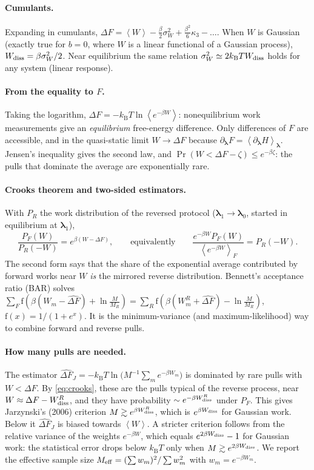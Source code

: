 \documentclass[11pt,a4paper]{article}
\newcommand{\kT}{k_{\mathrm B}T}
\newcommand{\avg}[1]{\left\langle #1\right\rangle}
\newcommand{\lam}{\bm{\lambda}}
\newcommand{\Wd}{W_{\rm diss}}
\newcommand{\dFJ}{\widehat{\Delta F}_J}
\begin{document}
\paragraph{Cumulants.} Expanding in cumulants,
$\Delta F=\avg W-\tfrac{\beta}{2}\sigma_W^2+\tfrac{\beta^2}{6}\kappa_3-\dots$. When $W$ is
Gaussian (exactly true for $b=0$, where $W$ is a linear functional of a Gaussian process),
$\Wd=\beta\sigma_W^2/2$. Near equilibrium the same relation $\sigma_W^2\simeq2\kT\Wd$ holds
for any system (linear response).

\paragraph{From the equality to $F$.} Taking the logarithm, $\Delta F=-\kT\ln\avg{e^{-\beta W}}$:
nonequilibrium work measurements give an \emph{equilibrium} free-energy difference. Only differences
of $F$ are accessible, and in the quasi-static limit $W\to\Delta F$ because
$\partial_{\lam}F=\avg{\partial_{\lam}H}_{\lam}$. Jensen's inequality gives the second law, and
$\Pr(W<\Delta F-\zeta)\le e^{-\beta\zeta}$: the pulls that dominate the average are exponentially rare.

\paragraph{Crooks theorem and two-sided estimators.} With $P_R$ the work distribution of the reversed
protocol ($\lam_1\to\lam_0$, started in equilibrium at $\lam_1$),
\begin{equation}
\frac{P_F(W)}{P_R(-W)}=e^{\beta(W-\Delta F)},\qquad\text{equivalently}\qquad
\frac{e^{-\beta W}P_F(W)}{\avg{e^{-\beta W}}_F}=P_R(-W).
\label{eq:crooks}
\end{equation}
The second form says that the share of the exponential average contributed by forward works near
$W$ \emph{is} the mirrored reverse distribution. Bennett's acceptance ratio (BAR) solves
$\sum_F\mathrm f(\beta(W_m-\widehat{\Delta F})+\ln\tfrac{M}{M_R})=\sum_R\mathrm f(\beta(W^R_m+\widehat{\Delta F})-\ln\tfrac{M}{M_R})$,
$\mathrm f(x)=1/(1+e^x)$. It is the minimum-variance (and maximum-likelihood) way to combine forward and reverse pulls.

\paragraph{How many pulls are needed.} The estimator
$\dFJ=-\kT\ln\big(M^{-1}\sum_m e^{-\beta W_m}\big)$ is dominated by rare pulls with
$W<\Delta F$. By \eqref{eq:crooks}, these are the pulls typical of the reverse process, near
$W\approx\Delta F-\Wd^R$, and they have probability $\sim e^{-\beta\Wd^R}$ under $P_F$. This gives
Jarzynski's (2006) criterion $M\gtrsim e^{\beta\Wd^R}$, which is $e^{\beta\Wd}$ for Gaussian work. Below it
$\dFJ$ is biased towards $\avg W$. A stricter
criterion follows from the relative variance of the weights $e^{-\beta W}$, which equals
$e^{2\beta\Wd}-1$ for Gaussian work: the statistical error drops below $\kT$ only when
$M\gtrsim e^{2\beta\Wd}$. We report the effective sample size
$M_{\rm eff}=(\sum w_m)^2/\sum w_m^2$ with $w_m=e^{-\beta W_m}$.
\end{document}
